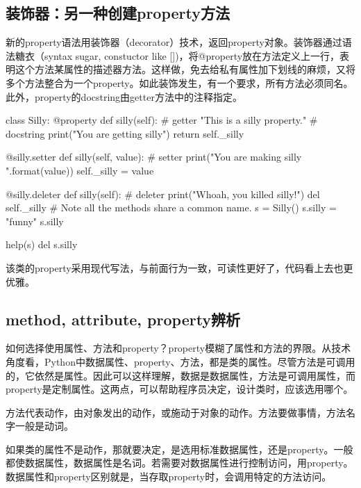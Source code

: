 \subsection{装饰器：另一种创建property方法}
新的property语法用装饰器（decorator）技术，返回property对象。装饰器通过语法糖衣（syntax sugar, constuctor like [])，将@property放在方法定义上一行，表明这个方法某属性的描述器方法。这样做，免去给私有属性加下划线的麻烦，又将多个方法整合为一个property。如此装饰发生，有一个要求，所有方法必须同名。此外，property的docstring由getter方法中的注释指定。
\begin{python}
class Silly:
    @property
    def silly(self):  # getter
        "This is a silly property."  # docstring
        print("You are getting silly")
        return self._silly

    @silly.setter
    def silly(self, value): #  setter
        print("You are making silly {}".format(value))
        self._silly = value

    @silly.deleter
    def silly(self):  # deleter
        print("Whoah, you killed silly!")
        del self._silly
# Note all the methods share a common name.
s = Silly()
s.silly = "funny"
s.silly

help(s)
del s.silly
\end{python}
该类的property采用现代写法，与前面行为一致，可读性更好了，代码看上去也更优雅。
\subsection{method, attribute, property辨析}
如何选择使用属性、方法和property？property模糊了属性和方法的界限。从技术角度看，Python中数据属性、property、方法，都是类的属性。尽管方法是可调用的，它依然是属性。因此可以这样理解，数据是数据属性，方法是可调用属性，而property是定制属性。这两点，可以帮助程序员决定，设计类时，应该选用哪个。

方法代表动作，由对象发出的动作，或施动于对象的动作。方法要做事情，方法名字一般是动词。

如果类的属性不是动作，那就要决定，是选用标准数据属性，还是property。一般都使数据属性，数据属性是名词。若需要对数据属性进行控制访问，用property。数据属性和property区别就是，当存取property时，会调用特定的方法访问。



